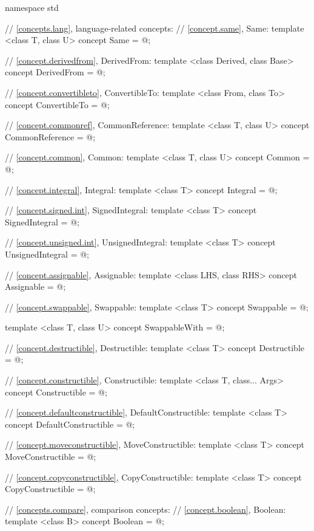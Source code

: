 %
\begin{codeblock}
namespace std {
  // \ref{concepts.lang}, language-related concepts:
  // \ref{concept.same}, Same:
  template <class T, class U>
  concept Same = @\seebelow@;

  // \ref{concept.derivedfrom}, DerivedFrom:
  template <class Derived, class Base>
  concept DerivedFrom = @\seebelow@;

  // \ref{concept.convertibleto}, ConvertibleTo:
  template <class From, class To>
  concept ConvertibleTo = @\seebelow@;

  // \ref{concept.commonref}, CommonReference:
  template <class T, class U>
  concept CommonReference = @\seebelow@;

  // \ref{concept.common}, Common:
  template <class T, class U>
  concept Common = @\seebelow@;

  // \ref{concept.integral}, Integral:
  template <class T>
  concept Integral = @\seebelow@;

  // \ref{concept.signed.int}, SignedIntegral:
  template <class T>
  concept SignedIntegral = @\seebelow@;

  // \ref{concept.unsigned.int}, UnsignedIntegral:
  template <class T>
  concept UnsignedIntegral = @\seebelow@;

  // \ref{concept.assignable}, Assignable:
  template <class LHS, class RHS>
  concept Assignable = @\seebelow@;

  // \ref{concept.swappable}, Swappable:
  template <class T>
  concept Swappable = @\seebelow@;

  template <class T, class U>
  concept SwappableWith = @\seebelow@;

  // \ref{concept.destructible}, Destructible:
  template <class T>
  concept Destructible = @\seebelow@;

  // \ref{concept.constructible}, Constructible:
  template <class T, class... Args>
  concept Constructible = @\seebelow@;

  // \ref{concept.defaultconstructible}, DefaultConstructible:
  template <class T>
  concept DefaultConstructible = @\seebelow@;

  // \ref{concept.moveconstructible}, MoveConstructible:
  template <class T>
  concept MoveConstructible = @\seebelow@;

  // \ref{concept.copyconstructible}, CopyConstructible:
  template <class T>
  concept CopyConstructible = @\seebelow@;

  // \ref{concepts.compare}, comparison concepts:
  // \ref{concept.boolean}, Boolean:
  template <class B>
  concept Boolean = @\seebelow@;

}
\end{codeblock}
